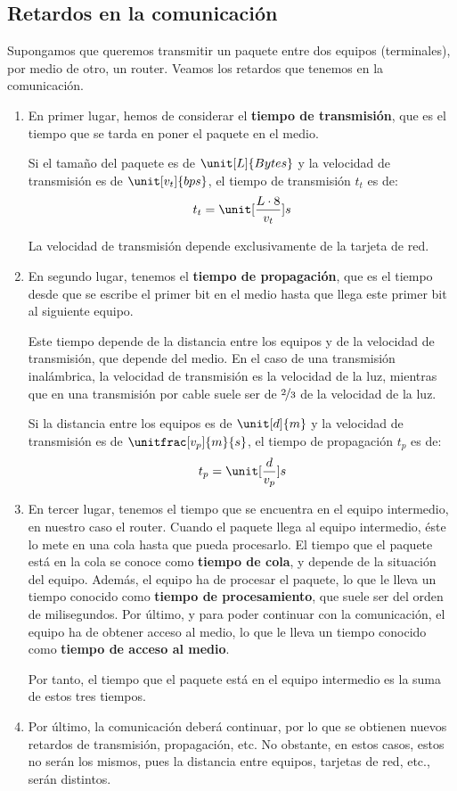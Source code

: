 \subsection{Retardos en la comunicación}
Supongamos que queremos transmitir un paquete entre dos equipos (terminales), por medio de otro, un router. Veamos los retardos que tenemos en la comunicación. 
\begin{enumerate}
    \item En primer lugar, hemos de considerar el \textbf{tiempo de transmisión}, que es el tiempo que se tarda en poner el paquete en el medio.
    
    Si el tamaño del paquete es de $\unit[L]{Bytes}$ y la velocidad de transmisión es de $\unit[v_t]{bps}$, el tiempo de transmisión $t_t$ es de:
    \begin{equation*}
        t_t = \unit[\frac{L\cdot 8}{v_t}]{s}
    \end{equation*}

    La velocidad de transmisión depende exclusivamente de la tarjeta de red.

    \item En segundo lugar, tenemos el \textbf{tiempo de propagación}, que es el tiempo desde que se escribe el primer bit en el medio hasta que llega este primer bit al siguiente equipo.
    
    Este tiempo depende de la distancia entre los equipos y de la velocidad de transmisión, que depende del medio. En el caso de una transmisión inalámbrica, la velocidad de transmisión es la velocidad de la luz, mientras que en una transmisión por cable suele ser de $\nicefrac{2}{3}$ de la velocidad de la luz.

    Si la distancia entre los equipos es de $\unit[d]{m}$ y la velocidad de transmisión es de $\unitfrac[v_p]{m}{s}$, el tiempo de propagación $t_p$ es de:
    \begin{equation*}
        t_p = \unit[\frac{d}{v_p}]{s}
    \end{equation*}

    \item En tercer lugar, tenemos el tiempo que se encuentra en el equipo intermedio, en nuestro caso el router. Cuando el paquete llega al equipo intermedio, éste lo mete en una cola hasta que pueda procesarlo. El tiempo que el paquete está en la cola se conoce como \textbf{tiempo de cola}, y depende de la situación del equipo. Además, el equipo ha de procesar el paquete, lo que le lleva un tiempo conocido como \textbf{tiempo de procesamiento}, que suele ser del orden de milisegundos. Por último, y para poder continuar con la comunicación, el equipo ha de obtener acceso al medio, lo que le lleva un tiempo conocido como \textbf{tiempo de acceso al medio}.
    
    Por tanto, el tiempo que el paquete está en el equipo intermedio es la suma de estos tres tiempos.

    \item Por último, la comunicación deberá continuar, por lo que se obtienen nuevos retardos de transmisión, propagación, etc. No obstante, en estos casos, estos no serán los mismos, pues la distancia entre equipos, tarjetas de red, etc., serán distintos.
\end{enumerate}

